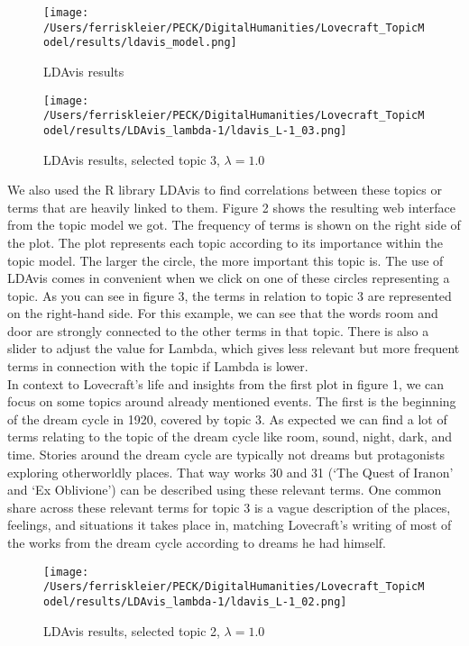 \begin{figure}[ht]
    \centering
    \texttt{[image: /Users/ferriskleier/PECK/DigitalHumanities/Lovecraft\_TopicModel/results/ldavis\_model.png]}
    \caption{LDAvis results}
    \label{fig:mesh2}
\end{figure}

\begin{figure}[ht]
    \centering
    \texttt{[image: /Users/ferriskleier/PECK/DigitalHumanities/Lovecraft\_TopicModel/results/LDAvis\_lambda-1/ldavis\_L-1\_03.png]}
    \caption{LDAvis results, selected topic 3, $\lambda=1.0$}
    \label{fig:mesh3}
\end{figure}

We also used the R library LDAvis to find correlations between these topics or terms that are heavily 
linked to them. Figure 2 shows the resulting web interface from the topic model we got. The frequency 
of terms is shown on the right side of the plot. The plot represents each topic according to its 
importance within the topic model. The larger the circle, the more important this topic is. The use of 
LDAvis comes in convenient when we click on one of these circles representing a topic. As you can see 
in figure 3, the terms in relation to topic 3 are represented on the right-hand side. For this example, 
we can see that the words room and door are strongly connected to the other terms in that topic. There 
is also a slider to adjust the value for Lambda, which gives less relevant but more frequent terms in 
connection with the topic if Lambda is lower.\\

In context to Lovecraft’s life and insights from the first plot in figure 1, we can focus on some 
topics around already mentioned events. The first is the beginning of the dream cycle in 1920, covered 
by topic 3. As expected we can find a lot of terms relating to the topic of the dream cycle like room, 
sound, night, dark, and time. Stories around the dream cycle are typically not dreams but protagonists 
exploring otherworldly places. That way works 30 and 31 (‘The Quest of Iranon’ and ‘Ex Oblivione’) can 
be described using these relevant terms. One common share across these relevant terms for topic 3 is a 
vague description of the places, feelings, and situations it takes place in, matching Lovecraft’s 
writing of most of the works from the dream cycle according to dreams he had himself.\\

\begin{figure}[ht]
    \centering
    \texttt{[image: /Users/ferriskleier/PECK/DigitalHumanities/Lovecraft\_TopicModel/results/LDAvis\_lambda-1/ldavis\_L-1\_02.png]}
    \caption{LDAvis results, selected topic 2, $\lambda=1.0$}
    \label{fig:mesh4}
\end{figure}

